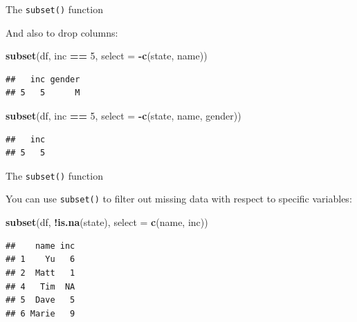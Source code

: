 \documentclass[ignorenonframetext,]{beamer}
\newenvironment{Shaded}{\begin{snugshade}}{\end{snugshade}}
\newcommand{\DataTypeTok}[1]{\textcolor[rgb]{0.13,0.29,0.53}{#1}}
\newcommand{\DecValTok}[1]{\textcolor[rgb]{0.00,0.00,0.81}{#1}}
\newcommand{\KeywordTok}[1]{\textcolor[rgb]{0.13,0.29,0.53}{\textbf{#1}}}
\newcommand{\NormalTok}[1]{#1}
\newcommand{\OperatorTok}[1]{\textcolor[rgb]{0.81,0.36,0.00}{\textbf{#1}}}
\newcommand{\StringTok}[1]{\textcolor[rgb]{0.31,0.60,0.02}{#1}}
\begin{document}
\begin{frame}[fragile]{The \texttt{subset()} function}
\protect\hypertarget{the-subset-function-5}{}

And also to drop columns:

\begin{Shaded}
\begin{Highlighting}[]
\KeywordTok{subset}\NormalTok{(df, inc }\OperatorTok{==}\StringTok{ }\DecValTok{5}\NormalTok{, }\DataTypeTok{select =} \OperatorTok{-}\KeywordTok{c}\NormalTok{(state, name))}
\end{Highlighting}
\end{Shaded}

\begin{verbatim}
##   inc gender
## 5   5      M
\end{verbatim}

\begin{Shaded}
\begin{Highlighting}[]
\KeywordTok{subset}\NormalTok{(df, inc }\OperatorTok{==}\StringTok{ }\DecValTok{5}\NormalTok{, }\DataTypeTok{select =} \OperatorTok{-}\KeywordTok{c}\NormalTok{(state, name, gender))}
\end{Highlighting}
\end{Shaded}

\begin{verbatim}
##   inc
## 5   5
\end{verbatim}

\end{frame}

\begin{frame}[fragile]{The \texttt{subset()} function}
\protect\hypertarget{the-subset-function-6}{}

You can use \texttt{subset()} to filter out missing data with respect to
specific variables:

\begin{Shaded}
\begin{Highlighting}[]
\KeywordTok{subset}\NormalTok{(df, }\OperatorTok{!}\KeywordTok{is.na}\NormalTok{(state), }\DataTypeTok{select =} \KeywordTok{c}\NormalTok{(name, inc))}
\end{Highlighting}
\end{Shaded}

\begin{verbatim}
##    name inc
## 1    Yu   6
## 2  Matt   1
## 4   Tim  NA
## 5  Dave   5
## 6 Marie   9
\end{verbatim}

\end{frame}
\end{document}
